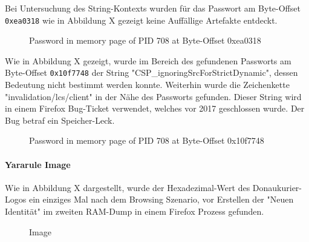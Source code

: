 Bei Untersuchung des String-Kontexts wurden für das Passwort am Byte-Offset \texttt{0xea0318} wie in Abbildung X gezeigt keine Auffällige Artefakte entdeckt.
\begin{figure}[h!]
	\centerline{}
	\label{chart:final-criteria}  
	\caption{Password in memory page of PID 708 at Byte-Offset 0xea0318}
\end{figure}
Wie in Abbildung X gezeigt, wurde im Bereich des gefundenen Passworts am Byte-Offset \texttt{0x10f7748} der String "CSP\_ignoringSrcForStrictDynamic", dessen Bedeutung nicht bestimmt werden konnte.
Weiterhin wurde die Zeichenkette "invalidation/lcs/client" in der Nähe des Passworts gefunden. Dieser String wird in einem Firefox Bug-Ticket verwendet, welches vor 2017 geschlossen wurde. Der Bug betraf ein Speicher-Leck.
\begin{figure}[h!]
	\centerline{}
	\label{chart:final-criteria}  
	\caption{Password in memory page of PID 708 at Byte-Offset 0x10f7748}
\end{figure}
	
\paragraph*{Yararule Image}
Wie in Abbildung X dargestellt, wurde der Hexadezimal-Wert des Donaukurier-Logos  ein einziges Mal nach dem Browsing Szenario, vor Erstellen der "Neuen Identität" im zweiten RAM-Dump in einem Firefox Prozess gefunden.
\begin{figure}[h!]
	\centerline{}
	\label{chart:final-criteria}  
	\caption{Image}
\end{figure}


